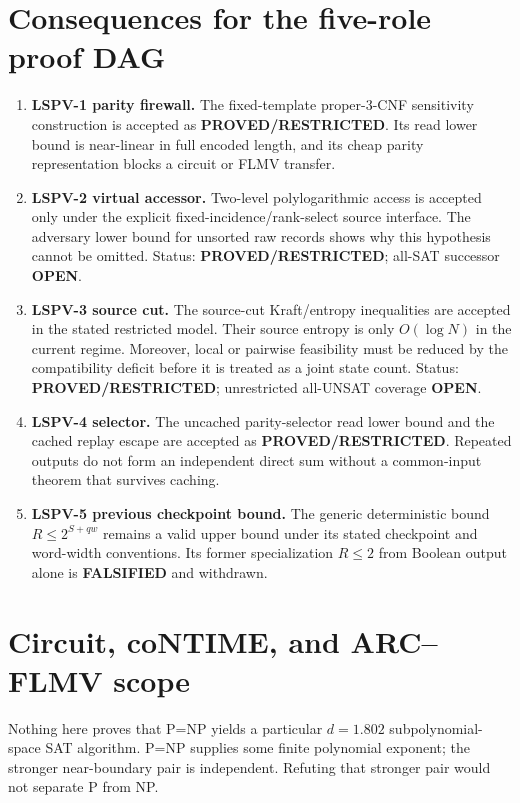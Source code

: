 \documentclass[11pt]{article}
\newcommand{\status}[1]{\textbf{#1}}
\begin{document}
\section*{Consequences for the five-role proof DAG}
\begin{enumerate}
  \item \textbf{LSPV-1 parity firewall.}  The fixed-template proper-3-CNF
        sensitivity construction is accepted as \status{PROVED/RESTRICTED}.
        Its read lower bound is near-linear in full encoded length, and its
        cheap parity representation blocks a circuit or FLMV transfer.
  \item \textbf{LSPV-2 virtual accessor.}  Two-level polylogarithmic access is
        accepted only under the explicit fixed-incidence/rank-select source
        interface.  The adversary lower bound for unsorted raw records shows
        why this hypothesis cannot be omitted.  Status:
        \status{PROVED/RESTRICTED}; all-SAT successor \status{OPEN}.
  \item \textbf{LSPV-3 source cut.}  The source-cut Kraft/entropy inequalities
        are accepted in the stated restricted model.  Their source entropy is
        only $O(\log N)$ in the current regime.  Moreover, local or pairwise
        feasibility must be reduced by the compatibility deficit before it is
        treated as a joint state count.  Status: \status{PROVED/RESTRICTED};
        unrestricted all-UNSAT coverage \status{OPEN}.
  \item \textbf{LSPV-4 selector.}  The uncached parity-selector read lower bound
        and the cached replay escape are accepted as
        \status{PROVED/RESTRICTED}.  Repeated outputs do not form an independent
        direct sum without a common-input theorem that survives caching.
  \item \textbf{LSPV-5 previous checkpoint bound.}  The generic deterministic
        bound $R\le2^{S+qw}$ remains a valid upper bound under its stated
        checkpoint and word-width conventions.  Its former specialization
        $R\le2$ from Boolean output alone is \status{FALSIFIED} and withdrawn.
\end{enumerate}

\section*{Circuit, coNTIME, and ARC--FLMV scope}
Nothing here proves that P=NP yields a particular $d=1.802$
subpolynomial-space SAT algorithm.  P=NP supplies some finite polynomial
exponent; the stronger near-boundary pair is independent.  Refuting that
stronger pair would not separate P from NP.
\end{document}
